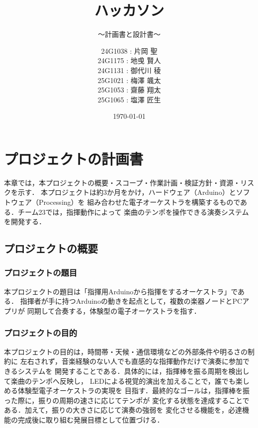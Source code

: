 \documentclass[lualatex,book,paper=a4paper,jafontsize=11.5pt,jafontscale=1.05]{jlreq}
\title{ハッカソン}
\subtitle{～計画書と設計書～}
\author{
  24G1038 : 片岡 聖\\
  24G1175 : 地曵 賢人\\
  24G1131 : 御代川 稜\\
  25G1021 : 梅澤 颯太\\
  25G1053 : 齋藤 翔太\\
  25G1065 : 塩澤 匠生
}
\date{\today}
\begin{document}
\maketitle

\setcounter{tocdepth}{2}
\tableofcontents \thispagestyle{empty}

\chapter{プロジェクトの計画書}\label{chap:project-plan}\setcounter{page}{1}

本章では，本プロジェクトの概要・スコープ・作業計画・検証方針・資源・リスクを示す．
本プロジェクトは約3か月をかけ，ハードウェア（Arduino）とソフトウェア（Processing）を
組み合わせた電子オーケストラを構築するものである．チーム23では，指揮動作によって
楽曲のテンポを操作できる演奏システムを開発する．

\section{プロジェクトの概要}\label{sec:overview}

\subsection{プロジェクトの題目}
本プロジェクトの題目は「指揮用Arduinoから指揮をするオーケストラ」である．
指揮者が手に持つArduinoの動きを起点として，複数の楽器ノードとPCアプリが
同期して合奏する，体験型の電子オーケストラを指す．

\subsection{プロジェクトの目的}
本プロジェクトの目的は，時間帯・天候・通信環境などの外部条件や明るさの制約に
左右されず，音楽経験のない人でも直感的な指揮動作だけで演奏に参加できるシステムを
開発することである．具体的には，指揮棒を振る周期を検出して楽曲のテンポへ反映し，
LEDによる視覚的演出を加えることで，誰でも楽しめる体験型電子オーケストラの実現を
目指す．最終的なゴールは，指揮棒を振った際に，振りの周期の速さに応じてテンポが
変化する状態を達成することである．加えて，振りの大きさに応じて演奏の強弱を
変化させる機能を，必達機能の完成後に取り組む発展目標として位置づける．
\end{document}
